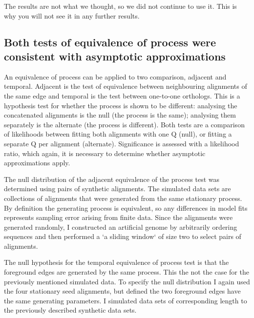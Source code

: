 The results are not what we thought, so we did not continue to use it. This is why you will not see it in any further results. 




\subsection*{Both tests of equivalence of process were consistent with asymptotic approximations}

An equivalence of process can be applied to two comparison, adjacent and temporal. Adjacent is the test of equivalence between neighbouring alignments of the same edge and temporal is the test between one-to-one orthologs. This is a hypothesis test for whether the process is shown to be different: analysing the concatenated alignments is the null (the process is the same); analysing them separately is the alternate (the process is different). Both tests are a comparison of likelihoods between fitting both alignments with one $\mathrm{Q}$ (null), or fitting a separate $\mathrm{Q}$ per alignment (alternate). Significance is assessed with a likelihood ratio, which again, it is necessary to determine whether asymptotic approximations apply. 

The null distribution of the adjacent equivalence of the process test was determined using pairs of synthetic alignments. The simulated data sets are collections of alignments that were generated from the same stationary process. By definition the generating process is equivalent, so any differences in model fits represents sampling error arising from finite data. Since the alignments were generated randomly, I constructed an artificial genome by arbitrarily ordering sequences and then performed a `a sliding window` of size two to select pairs of alignments.

The null hypothesis for the temporal equivalence of process test is that the foreground edges are generated by the same process. This the not the case for the previously mentioned simulated data. To specify the null distribution I again used the four stationary seed alignments, but defined the two foreground edges have the same generating parameters. I simulated data sets of corresponding length to the previously described synthetic data sets. 

